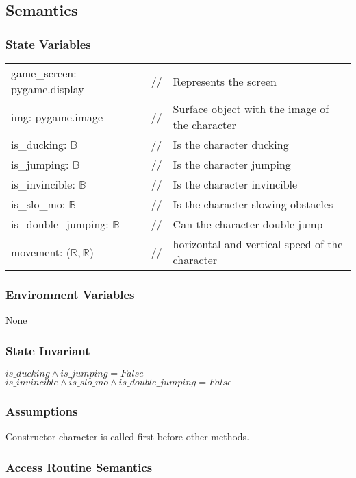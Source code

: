 \documentclass[12pt]{article}
\begin{document}
\subsection* {Semantics}

\subsubsection* {State Variables}

\begin{tabular}{lll}
    game\_screen: pygame.display & // & Represents the screen \\
    img: pygame.image & // & Surface object with the image of the character\\
    is\_ducking: $\mathbb{B}$ & // & Is the character ducking\\
    is\_jumping: $\mathbb{B}$ & // & Is the character jumping\\
    is\_invincible: $\mathbb{B}$ & // & Is the character invincible\\
    is\_slo\_mo: $\mathbb{B}$ & // & Is the character slowing obstacles\\
    is\_double\_jumping: $\mathbb{B}$ & // & Can the character double jump\\
    movement: ($\mathbb{R,R}$) & // & horizontal and vertical speed of the character\\
\end{tabular}

\subsubsection* {Environment Variables}
None
\subsubsection* {State Invariant}

$is\_ducking \land is\_jumping = False$\\
$is\_invincible \land is\_slo\_mo \land is\_double\_jumping = False$\\
\subsubsection* {Assumptions}

Constructor character is called first before other methods.

\subsubsection* {Access Routine Semantics}
\end{document}
